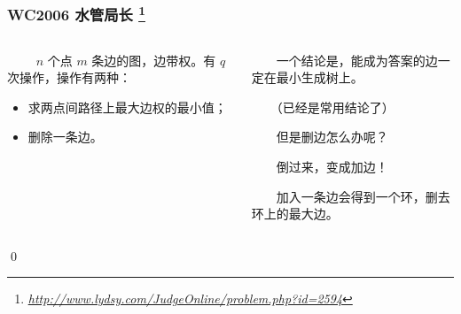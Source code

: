 \documentclass[9pt,dvipsnames,table]{beamer}
\newcommand{\hlink}[1]{
	\footnote{\fontsize{6pt}{\baselineskip}\href{#1}{\textsl{\underline{#1}}}}
}
\newenvironment{qedframe}{%
	\begin{frame}[environment=qedqedframe]%
	}{%
	\qed
	\end{frame}%
}
\begin{document}
\begin{qedframe}
	\frametitle{WC2006 水管局长\hlink{http://www.lydsy.com/JudgeOnline/problem.php?id=2594}}
	\begin{columns}
		\begin{column}{0.5\textwidth}
			　　 $ n $ 个点 $ m $ 条边的图，边带权。有 $ q $ 次操作，操作有两种：
			\begin{itemize}
				\item 求两点间路径上最大边权的最小值；
				\item 删除一条边。
			\end{itemize}
		\end{column} \pause
		\begin{column}{0.5\textwidth}
			　　一个结论是，能成为答案的边一定在最小生成树上。
			
			　　（已经是常用结论了）
			
			　　但是删边怎么办呢？\pause
			
			　　倒过来，变成加边！\pause
			
			　　加入一条边会得到一个环，删去环上的最大边。
		\end{column}
	\end{columns}
\end{qedframe}
\end{document}
